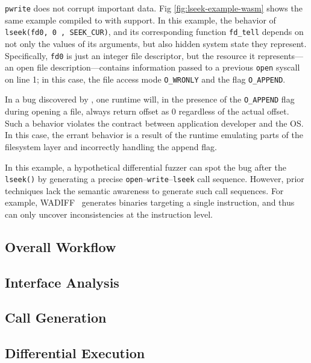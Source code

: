 \texttt{pwrite} does not corrupt important data.
%
Fig \ref{fig:lseek-example-wasm} shows the same example compiled to \wasm{} with
\wasi{} support.
%
In this example, the behavior of \texttt{lseek(fd0, 0 , SEEK\_CUR)}, and its
corresponding \wasi{} function \texttt{fd\_tell} depends on not only the values
of its arguments, but also hidden system state they represent.
%
Specifically, \texttt{fd0} is just an integer file descriptor, but the resource
it represents---an open file description---contains information passed to a
previous \texttt{open} syscall on line 1; in this case, the file access mode
\texttt{O\_WRONLY} and the flag \texttt{O\_APPEND}.
%
\par
%
In a bug discovered by \wazzi{}, one \wasm{} runtime will, in the presence of
the \texttt{O\_APPEND} flag during opening a file, always return offset as $0$
regardless of the actual offset. Such a behavior violates the contract between
application developer and the OS. In this case, the errant behavior is a result
of the \wasm{} runtime emulating parts of the filesystem layer and incorrectly
handling the append flag.
%
\par
%
In this example, a hypothetical differential fuzzer can spot the bug after the
\texttt{lseek()} by generating a precise
\texttt{open}--\texttt{write}--\texttt{lseek} call sequence.
%
However, prior techniques lack the semantic awareness to generate such call
sequences.
%
For example, WADIFF~\cite{wadiff} generates \wasm{} binaries targeting a single
instruction, and thus can only uncover inconsistencies at the instruction level.
%
\subsection{Overall Workflow}
%
\subsection{Interface Analysis}
%
\subsection{Call Generation}
%
\subsection{Differential Execution}

